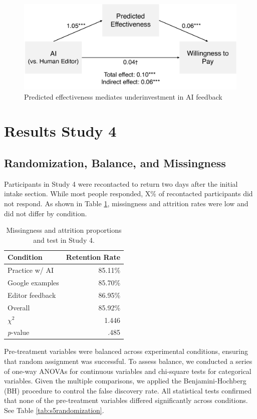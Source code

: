 \documentclass[11pt]{report}
\begin{document}
\begin{append}
\begin{figure}
    \centering
    \includegraphics[width=0.5\linewidth]{mediation.pdf}
    \caption{Predicted effectiveness mediates underinvestment in AI feedback}
    \label{fig:mediation}
\end{figure}
\FloatBarrier


\section{Results Study 4}
\subsection{Randomization, Balance, and Missingness}
Participants in Study 4 were recontacted to return two days after the initial intake section. While most people responded, X\% of recontacted participants did not respond. As shown in Table \ref{tab:s5missingness}, missingness and attrition rates were low and did not differ by condition.

\begin{table}
\centering
\caption{Missingness and attrition proportions and test in Study 4.}

\begin{tabular}{lr}
\toprule
Condition & Retention Rate \\ 
\midrule
Practice w/ AI & 85.11\% \\ 
Google examples & 85.70\% \\ 
Editor feedback & 86.95\% \\ \midrule
Overall & 85.92\% \\ \midrule
$\chi^2$ & 1.446 \\ 
\textit{p}-value & .485 \\ 
\bottomrule
\end{tabular}
\label{tab:s5missingness}
\end{table}

Pre-treatment variables were balanced across experimental conditions, ensuring that random assignment was successful. To assess balance, we conducted a series of one-way ANOVAs for continuous variables and chi-square tests for categorical variables. Given the multiple comparisons, we applied the Benjamini-Hochberg (BH) procedure to control the false discovery rate. All statistical tests confirmed that none of the pre-treatment variables differed significantly across conditions. See Table \ref{tab:s5randomization}.
    

\end{append}
\end{document}
